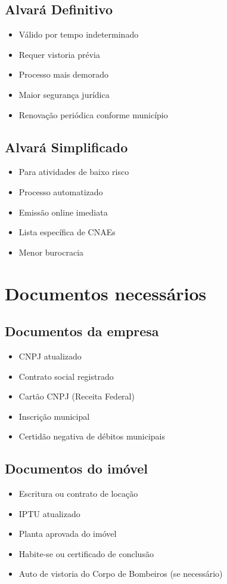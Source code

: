 \documentclass[12pt,a4paper]{article}
\begin{document}
\subsection{Alvará Definitivo}
\begin{itemize}
    \item Válido por tempo indeterminado
    \item Requer vistoria prévia
    \item Processo mais demorado
    \item Maior segurança jurídica
    \item Renovação periódica conforme município
\end{itemize}

\subsection{Alvará Simplificado}
\begin{itemize}
    \item Para atividades de baixo risco
    \item Processo automatizado
    \item Emissão online imediata
    \item Lista específica de CNAEs
    \item Menor burocracia
\end{itemize}

\section{Documentos necessários}

\subsection{Documentos da empresa}
\begin{itemize}
    \item CNPJ atualizado
    \item Contrato social registrado
    \item Cartão CNPJ (Receita Federal)
    \item Inscrição municipal
    \item Certidão negativa de débitos municipais
\end{itemize}

\subsection{Documentos do imóvel}
\begin{itemize}
    \item Escritura ou contrato de locação
    \item IPTU atualizado
    \item Planta aprovada do imóvel
    \item Habite-se ou certificado de conclusão
    \item Auto de vistoria do Corpo de Bombeiros (se necessário)
\end{itemize}
\end{document}
